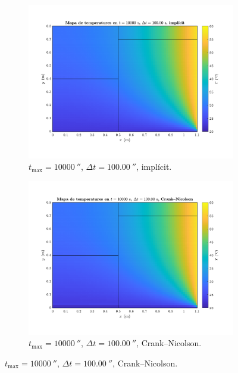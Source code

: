 \begin{figure}[ht]
\begin{subfigure}{.5\textwidth}
		\label{fig:esquema_10}
	\end{subfigure}
	\begin{subfigure}{.5\textwidth}
		\centering
		\includegraphics[width=.95\linewidth]{imagenes/04_analisi_influencia_dades_numeriques/esquema/esquema_11.pdf}
		\vspace{-15pt}
		\caption{$t_\text{max} = 10000 \ \second$, $\Delta t = 100.00 \ \second$, implícit.}
		\label{fig:esquema_11}
	\end{subfigure}%
	\begin{subfigure}{.5\textwidth}
		\centering
		\includegraphics[width=.95\linewidth]{imagenes/04_analisi_influencia_dades_numeriques/esquema/esquema_12.pdf}
		\vspace{-15pt}
		\caption{$t_\text{max} = 10000 \ \second$, $\Delta t = 100.00 \ \second$, Crank--Nicolson.}

\end{subfigure}
\end{figure}
